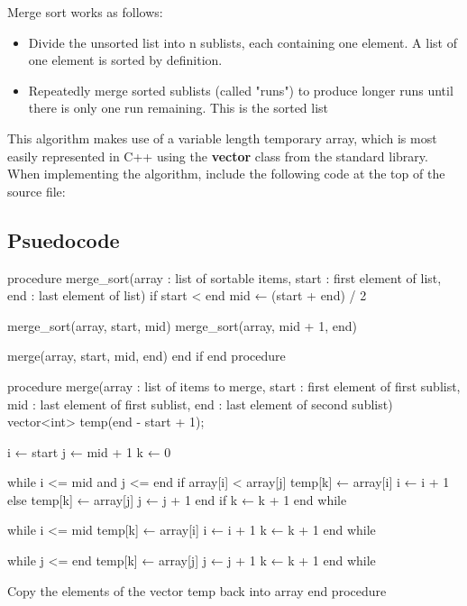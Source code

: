 \documentclass{report}
\begin{document}
    \pagebreak 
    \bigbreak \noindent 
    \begin{concept}
        Merge sort works as follows:
        \begin{itemize}
            \item Divide the unsorted list into n sublists, each containing one element. A list of one element is sorted by definition.
            \item Repeatedly merge sorted sublists (called "runs") to produce longer runs until there is only one run remaining. This is the sorted list
        \end{itemize}
    \end{concept}
    \bigbreak \noindent 
    \bigbreak \noindent 
    This algorithm makes use of a variable length temporary array, which is most easily represented in C++ using the \textbf{vector} class from the standard library. When implementing the algorithm, include the following code at the top of the source file:
    \pagebreak 
    \subsection{Psuedocode}
    \bigbreak \noindent 
    \begin{cppcode}
procedure merge_sort(array : list of sortable items, start : first element of list, 
end : last element of list)
    if start < end
        mid ← (start + end) / 2
    
        merge_sort(array, start, mid)
        merge_sort(array, mid + 1, end)
    
        merge(array, start, mid, end)
    end if
end procedure

procedure merge(array : list of items to merge, start : first element of first sublist, mid : last element of first sublist,
  end : last element of second sublist)
    vector<int> temp(end - start + 1);

    i ← start
    j ← mid + 1
    k ← 0
    
    while i <= mid and j <= end
        if array[i] < array[j]
            temp[k] ← array[i]
            i ← i + 1
        else
            temp[k] ← array[j]
            j ← j + 1
        end if
        k ← k + 1
    end while
    
    while i <= mid
        temp[k] ← array[i]
        i ← i + 1
        k ← k + 1
    end while
    
    while j <= end
        temp[k] ← array[j]
        j ← j + 1
        k ← k + 1
    end while
    
    Copy the elements of the vector temp back into array
end procedure
    \end{cppcode}
\end{document}
